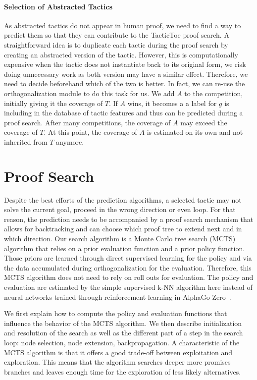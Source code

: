 \documentclass[runningheads,a4paper,draft]{svjour3}
\def\tactictoe{\textsf{TacticToe}\xspace}
\begin{document}
\paragraph{Selection of Abstracted Tactics}
As abstracted tactics do not appear in human proof, we need to find a way to 
predict them so that they can contribute to the \tactictoe proof search.
A straightforward idea is to duplicate each tactic during the proof search by 
creating an abstracted version of the tactic. However, this is computationally 
expensive when the tactic does not instantiate back to its original form, we 
risk doing unnecessary work as both version may have a similar effect.
Therefore, we need to decide beforehand which of the two is better.
In fact, we can re-use the orthogonalization module to do this task for us.
We add $A$ to the competition, initially giving it the coverage of $T$. If $A$ 
wins, it becomes a a label for $g$ is including in the database of tactic 
features and thus can be predicted during a proof search.
After many competitions, the coverage of $A$ may exceed the coverage of $T$. At 
this point, the coverage of $A$ is estimated on its own and not inherited from 
$T$ anymore.



\section{Proof Search}\label{sec:proofsearch}

Despite the best efforts of the prediction algorithms, a selected tactic may 
not solve the current goal, proceed in the wrong direction
or even loop. For that reason, the prediction needs to be accompanied by a  
proof search mechanism that allows for backtracking and 
can choose which proof tree to extend next and in which direction.
Our search algorithm is a Monte Carlo tree search (MCTS) algorithm that relies 
on a prior evaluation function and a prior policy function. Those priors are 
learned through direct supervised learning for the policy and via the data 
accumulated during orthogonalization for the evaluation. Therefore, this MCTS 
algorithm does not need to rely on roll outs for evaluation. The 
policy and evaluation are estimated by the simple supervised k-NN algorithm 
here instead of neural networks trained through reinforcement learning in 
AlphaGo Zero~\cite{silver2017mastering}. 

We first explain how to compute the policy and evaluation functions that 
influence the behavior of the MCTS algorithm.
We then describe initialization and resolution of the search as well as the 
different part of a step in the search loop: node selection, node 
extension, backpropagation.
A characteristic of the MCTS algorithm is that it offers a good trade-off 
between exploitation and exploration. This means that the algorithm searches
deeper more promises branches and leaves enough time for the exploration 
of less likely alternatives.
\end{document}
